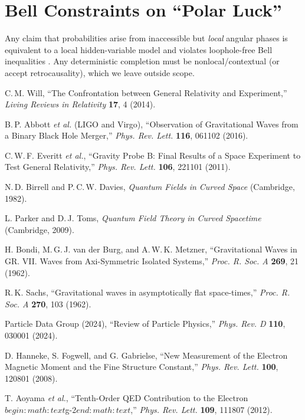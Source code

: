 \documentclass[reprint,amsmath,amssymb,aps]{revtex4-2}
\begin{document}
\section{Bell Constraints on ``Polar Luck''}
Any claim that probabilities arise from inaccessible but \emph{local} angular phases is equivalent to a local hidden-variable model and violates loophole-free Bell inequalities \cite{Hensen2015,Giustina2015,Shalm2015}. Any deterministic completion must be nonlocal/contextual (or accept retrocausality), which we leave outside scope.

\begin{thebibliography}{99}

C.\,M. Will, ``The Confrontation between General Relativity and Experiment,'' \emph{Living Reviews in Relativity} \textbf{17}, 4 (2014).

B.\,P. Abbott \emph{et al.} (LIGO and Virgo), ``Observation of Gravitational Waves from a Binary Black Hole Merger,'' \emph{Phys. Rev. Lett.} \textbf{116}, 061102 (2016).

C.\,W.\,F. Everitt \emph{et al.}, ``Gravity Probe B: Final Results of a Space Experiment to Test General Relativity,'' \emph{Phys. Rev. Lett.} \textbf{106}, 221101 (2011).

N.\,D. Birrell and P.\,C.\,W. Davies, \emph{Quantum Fields in Curved Space} (Cambridge, 1982).

L. Parker and D.\,J. Toms, \emph{Quantum Field Theory in Curved Spacetime} (Cambridge, 2009).

H. Bondi, M.\,G.\,J. van der Burg, and A.\,W.\,K. Metzner, ``Gravitational Waves in GR. VII. Waves from Axi-Symmetric Isolated Systems,'' \emph{Proc. R. Soc. A} \textbf{269}, 21 (1962).

R.\,K. Sachs, ``Gravitational waves in asymptotically flat space-times,'' \emph{Proc. R. Soc. A} \textbf{270}, 103 (1962).

Particle Data Group (2024), ``Review of Particle Physics,'' \emph{Phys. Rev. D} \textbf{110}, 030001 (2024).

D. Hanneke, S. Fogwell, and G. Gabrielse, ``New Measurement of the Electron Magnetic Moment and the Fine Structure Constant,'' \emph{Phys. Rev. Lett.} \textbf{100}, 120801 (2008).

T. Aoyama \emph{et al.}, ``Tenth-Order QED Contribution to the Electron $begin:math:text$g-2$end:math:text$,'' \emph{Phys. Rev. Lett.} \textbf{109}, 111807 (2012).


\end{thebibliography}
\end{document}
